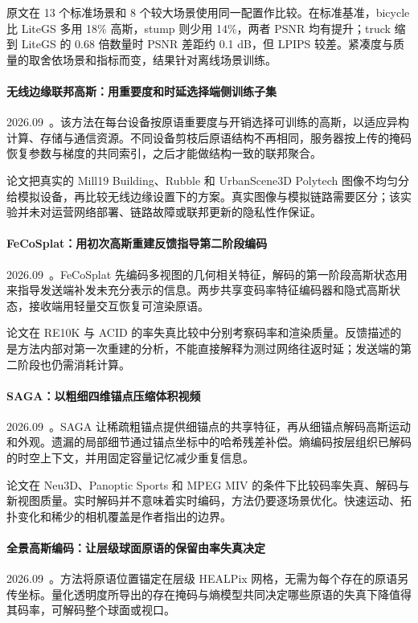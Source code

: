原文在 13 个标准场景和 8 个较大场景使用同一配置作比较。在标准基准，bicycle 比 LiteGS 多用 18\% 高斯，stump 则少用 14\%，两者 PSNR 均有提升；truck 缩到 LiteGS 的 0.68 倍数量时 PSNR 差距约 0.1 dB，但 LPIPS 较差。紧凑度与质量的取舍依场景和指标而变，结果针对离线场景训练。

\paragraph{无线边缘联邦高斯：用重要度和时延选择端侧训练子集}
2026.09~\cite{2609_32177}。该方法在每台设备按原语重要度与开销选择可训练的高斯，以适应异构计算、存储与通信资源。不同设备剪枝后原语结构不再相同，服务器按上传的掩码恢复参数与梯度的共同索引，之后才能做结构一致的联邦聚合。

论文把真实的 Mill19 Building、Rubble 和 UrbanScene3D Polytech 图像不均匀分给模拟设备，再比较无线边缘设置下的方案。真实图像与模拟链路需要区分；该实验并未对运营网络部署、链路故障或联邦更新的隐私性作保证。

\paragraph{FeCoSplat：用初次高斯重建反馈指导第二阶段编码}
2026.09~\cite{2609_33330}。FeCoSplat 先编码多视图的几何相关特征，解码的第一阶段高斯状态用来指导发送端补发未充分表示的信息。两步共享变码率特征编码器和隐式高斯状态，接收端用轻量交互恢复可渲染原语。

论文在 RE10K 与 ACID 的率失真比较中分别考察码率和渲染质量。反馈描述的是方法内部对第一次重建的分析，不能直接解释为测过网络往返时延；发送端的第二阶段也仍需消耗计算。

\paragraph{SAGA：以粗细四维锚点压缩体积视频}
2026.09~\cite{2609_33969}。SAGA 让稀疏粗锚点提供细锚点的共享特征，再从细锚点解码高斯运动和外观。遗漏的局部细节通过锚点坐标中的哈希残差补偿。熵编码按层组织已解码的时空上下文，并用固定容量记忆减少重复信息。

论文在 Neu3D、Panoptic Sports 和 MPEG MIV 的条件下比较码率失真、解码与新视图质量。实时解码并不意味着实时编码，方法仍要逐场景优化。快速运动、拓扑变化和稀少的相机覆盖是作者指出的边界。

\paragraph{全景高斯编码：让层级球面原语的保留由率失真决定}
2026.09~\cite{2609_34367}。方法将原语位置锚定在层级 HEALPix 网格，无需为每个存在的原语另传坐标。量化透明度所导出的存在掩码与熵模型共同决定哪些原语的失真下降值得其码率，可解码整个球面或视口。

